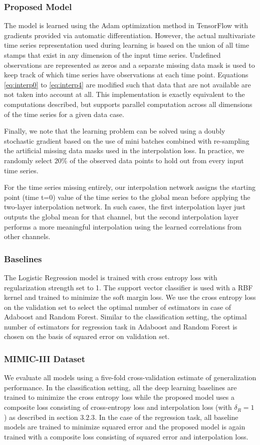 \documentclass{article} \usepackage{iclr2019_conference,times}
\begin{document}
\subsubsection{Proposed Model}
The model is learned using the Adam optimization method 
in TensorFlow with gradients provided via automatic differentiation.
However, the actual multivariate time series  
representation used during learning is based on the union
of all time stamps that exist in any dimension of the input time series.
Undefined observations are represented as zeros and a separate
missing data mask is used to keep track of which time series have
observations at each time point. Equations \ref{eq:interp0} to \ref{eq:interp4} are modified such
that data that are not available are not taken into account at all.
This implementation is exactly equivalent to the computations
described, but supports parallel computation
across all dimensions of the time series for a given data case.

Finally, we note that the learning problem can be solved using a
doubly stochastic gradient based on the use of mini batches
combined with re-sampling the artificial missing data masks 
used in the interpolation loss. In practice, we randomly select
$20\%$ of the observed data points to hold out from every input time
series. 

For the time series missing entirely, our interpolation network assigns the starting point (time t=0) value of the time series to the global mean before applying the two-layer interpolation network. In such cases, the first interpolation layer just outputs the global mean for that channel, but the second interpolation layer performs a more meaningful interpolation using the learned correlations from other channels.

\subsubsection{Baselines}
The Logistic Regression model is trained with cross entropy loss with regularization strength set to 1. The support vector classifier is used with a RBF kernel and trained to minimize the soft margin loss. We use the cross entropy loss on the validation set to select the optimal number of estimators in case of Adaboost and Random Forest. Similar to the classification setting, the optimal number of estimators for regression task in Adaboost and Random Forest is chosen on the basis of squared error on validation set.

\subsubsection*{MIMIC-III Dataset}
We evaluate all models using a five-fold cross-validation estimate of generalization performance.
In the classification setting,  all the deep learning baselines are trained to minimize the cross entropy loss while the proposed model uses a composite loss consisting of cross-entropy loss and interpolation loss (with $\delta_R = 1$) as described in section $3.2.3$. In the case of the regression task, all baseline models are trained to minimize squared error and the proposed model is again trained with a composite loss consisting of squared error and interpolation loss.
\end{document}
